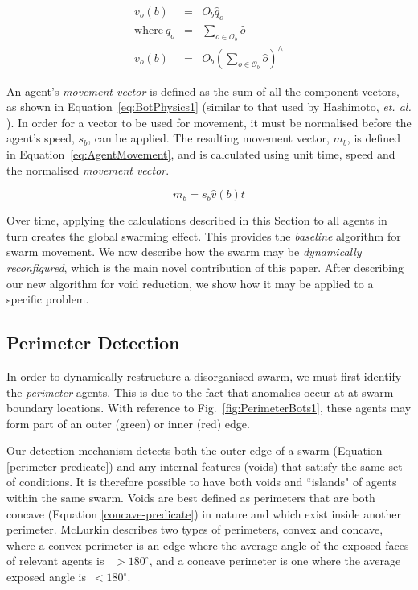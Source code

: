 \documentclass[letterpaper]{article}
\begin{document}
\begin{eqnarray}\label{eq:Obstacle2}
  v_o(b) & = & O_b \hat q_o \\
	\mathrm{where~}  q_o & = & \sum_{o\in \mathcal O_b } \hat o
	\nonumber \\
	v_o(b) & = & O_b \left(\sum_{o\in \mathcal O_b }\hat o\right)^{\!\!\wedge} \nonumber
\end{eqnarray}

An agent's \textit{movement vector} is defined as the sum of all the component vectors, as shown in Equation~\ref{eq:BotPhysics1} (similar to that used by Hashimoto, {\it et. al.} \cite{HAY:08}). In order for a vector to be used for movement, it must be normalised before the agent's speed, $s_b$, can be applied. The resulting movement vector, $m_b$, is defined in Equation~\ref{eq:AgentMovement}, and is calculated using unit time, speed and the normalised \textit{movement vector}.

\begin{equation}\label{eq:AgentMovement}
m_b = s_b  \hat v(b)  t
\end{equation}

Over time, applying the calculations described in this Section to all agents in turn creates the global swarming effect. This provides the {\it baseline} algorithm for swarm movement.
We now describe how the swarm may be {\it dynamically reconfigured}, which is the main novel contribution of this paper. After describing our new algorithm for void reduction, we show how it may be applied to a specific problem.
  
\subsection{Perimeter Detection}
\label{sec:PerimeterDetection}

In order to dynamically restructure a disorganised swarm, we must first identify the {\it perimeter} agents. This is due to the fact that anomalies occur at at swarm boundary locations. With reference to Fig.~\ref{fig:PerimeterBots1}, these agents may form part of an outer ({\color{green}green}) or inner ({\color{red}red}) edge.

Our detection mechanism detects both the outer edge of a swarm (Equation \ref{perimeter-predicate}) and any internal features (voids) that satisfy the same set of conditions. It is therefore possible to have both voids and ``islands" of agents within the same swarm. Voids are best defined as perimeters that are both concave (Equation \ref{concave-predicate}) in nature and which exist inside another perimeter. McLurkin \cite{MD:09} describes two types of perimeters, convex and concave, where a convex perimeter is an edge where the average angle of the exposed faces of relevant agents is ~$> 180^\circ$, and a concave perimeter is one where the average exposed angle is~$< 180^\circ$.
\end{document}

